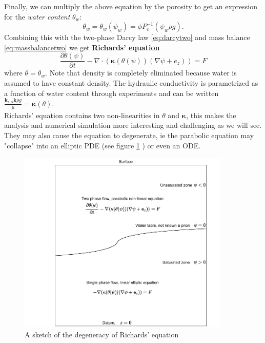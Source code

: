 \documentclass[../Main/main.tex]{subfiles}
\begin{document}
Finally, we can multiply the above equation by the porosity to get an expression for the \emph{water content} $\theta_w$:
\begin{equation*}
	\theta_w = \theta_w(\psi_w) = \phi P_c^{-1}(\psi_w\rho g).
\end{equation*}  
Combining this with the two-phase Darcy law \eqref{eq:darcytwo} and mass balance \eqref{eq:massbalancetwo} we get \textbf{Richards' equation}
\begin{equation}\label{eq:richards}
	\frac{\partial \theta(\psi)}{\partial t} - \nabla \cdot (\bm{\kappa} (\theta (\psi))(\nabla \psi + e_z)) = F
\end{equation}
where $\theta = \theta_w$. Note that density is completely eliminated because water is assumed to have constant density. The hydraulic conductivity is parametrized as a function of water content through experiments and can be written  $\frac{\bm{k}_{r,\alpha}\bm{k}\rho g}{\mu} = \bm{\kappa}(\theta)$. \\
Richards' equation contains two non-linearities in $\theta$ and $\bm{\kappa}$, this makes the analysis and numerical simulation more interesting and challenging as we will see. They may also cause the equation to degenerate, ie the parabolic equation may "collapse" into an elliptic PDE (see figure \ref{fig:richards} ) or even an ODE.
\begin{figure}[h]
	\centering
	\includegraphics[width=0.9\textwidth]{Richards.pdf}
	\caption{A sketch of the degeneracy of Richards' equation}
	\label{fig:richards}
\end{figure}




\listoftodos[Notes]
 
\end{document}
